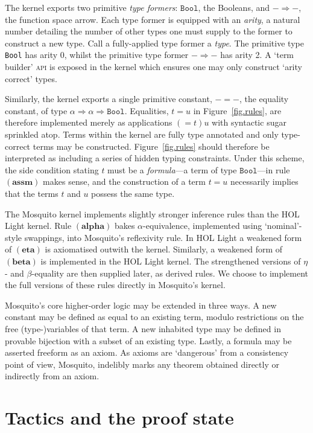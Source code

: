 \documentclass{llncs}
\newcommand{\mosquito}{Mosquito\xspace}
\newcommand{\rulefont}[1]{\ensuremath{(\mathbf{#1})}}
\begin{document}
The kernel exports two primitive \emph{type formers}: $\mathtt{Bool}$, the Booleans, and $- \Rightarrow -$, the function space arrow.
Each type former is equipped with an \emph{arity}, a natural number detailing the number of other types one must supply to the former to construct a new type.
Call a fully-applied type former a \emph{type}.
The primitive type \texttt{Bool} has arity 0, whilst the primitive type former $- \Rightarrow -$ has arity 2.
A `term builder' \textsc{api} is exposed in the kernel which ensures one may only construct `arity correct' types.

Similarly, the kernel exports a single primitive constant, $- = -$, the equality constant, of type $\alpha \Rightarrow \alpha \Rightarrow \mathtt{Bool}$.
Equalities, $t = u$ in Figure~\ref{fig.rules}, are therefore implemented merely as applications $(= t) u$ with syntactic sugar sprinkled atop.
Terms within the kernel are fully type annotated and only type-correct terms may be constructed.
Figure~\ref{fig.rules} should therefore be interpreted as including a series of hidden typing constraints.
Under this scheme, the side condition stating $t$ must be a \emph{formula}---a term of type $\mathtt{Bool}$---in rule \rulefont{assm} makes sense, and the construction of a term $t = u$ necessarily implies that the terms $t$ and $u$ possess the same type.

The \mosquito kernel implements slightly stronger inference rules than the HOL Light kernel.
Rule \rulefont{alpha} bakes $\alpha$-equivalence, implemented using `nominal'-style swappings, into \mosquito's reflexivity rule.
In HOL Light a weakened form of \rulefont{eta} is axiomatised outwith the kernel.
Similarly, a weakened form of \rulefont{beta} is implemented in the HOL Light kernel.
The strengthened versions of $\eta$- and $\beta$-equality are then supplied later, as derived rules.
We choose to implement the full versions of these rules directly in \mosquito's kernel.

\mosquito's core higher-order logic may be extended in three ways.
A new constant may be defined as equal to an existing term, modulo restrictions on the free (type-)variables of that term.
A new inhabited type may be defined in provable bijection with a subset of an existing type.
Lastly, a formula may be asserted freeform as an axiom.
As axioms are `dangerous' from a consistency point of view, \mosquito, indelibly marks any theorem obtained directly or indirectly from an axiom.

\section{Tactics and the proof state}
\label{sect.tactics.proof.state}
\end{document}
